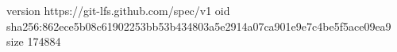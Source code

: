 version https://git-lfs.github.com/spec/v1
oid sha256:862ece5b08c61902253bb53b434803a5e2914a07ca901e9e7c4be5f5ace09ea9
size 174884
